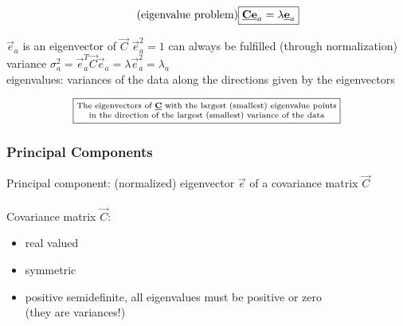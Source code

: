 \begin{equation} \tag{eigenvalue problem}
	\fbox{$ \vec{C} \vec{e}_a = \lambda \vec{e}_a $}
\end{equation}
\begin{itemize}
	\itl $\vec{e}_a$ is an eigenvector of $\vec{C}$
	\itl $\vec{e}_a^2 = 1$ can always be fulfilled (through normalization)
	\itl variance $\sigma_a^2 = \vec{e}_a^T \vec{C} \vec{e}_a
		= \lambda \vec{e}_a^2 = \lambda_a$ \\
		eigenvalues: variances of the data along the directions given by
		the eigenvectors
\end{itemize}
\[\fbox{$ \substack{ \text{The eigenvectors of } \vec{C} \text{ with the largest
	(smallest) eigenvalue points} \\ 
	\text{in the direction of the largest (smallest) variance of the data} 
	} $}
\]


\subsubsection{Principal Components}
Principal component: (normalized) eigenvector $\vec{e}$ of a covariance matrix $\vec{C}$
\\\\
Covariance matrix $\vec{C}$:
\begin{itemize}
  \item real valued
  \item symmetric
  \item positive semidefinite, all eigenvalues must be positive or zero\\
		(they are variances!)
\end{itemize}
